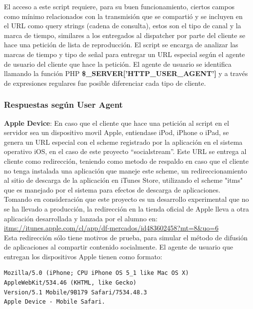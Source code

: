 El acceso a este script requiere, para su buen funcionamiento, ciertos campos como mínimo relacionados con la transmisión que se compartió y se incluyen en el URL como query strings (cadena de consulta), estos son el tipo de canal y la marca de tiempo, similares a los entregados al dispatcher por parte del cliente se hace una petición de lista de reproducción.
El script se encarga de analizar las marcas de tiempo y tipo de señal para entregar un URL especial según el agente de usuario del cliente que hace la petición.
El agente de usuario se identifica llamando la función PHP \textbf{\$\_SERVER['HTTP\_USER\_AGENT']} y a través de expresiones regulares fue posible diferenciar cada tipo de cliente.

		\subsubsection{Respuestas según User Agent}
\textbf{Apple Device}: En caso que el cliente que hace una petición al script en el servidor sea un dispositivo movil Apple, entiendase iPod, iPhone o iPad, se genera un URL especial con el scheme registrado por la aplicación en el sistema operativo iOS, en el caso de este proyecto \textquotedblleft socialstream\textquotedblright . Este URL se entrega al cliente como redirección, teniendo como metodo de respaldo en caso que el cliente no tenga instalada una aplicación que maneje este scheme, un redireccionamiento al sitio de descarga de la aplicación en iTunes Store, utilizando el scheme "itms" que es manejado por el sistema para efectos de descarga de aplicaciones. \\ 

Tomando en consideración que este proyecto es un desarrollo experimental que no se ha llevado a producción, la redirección en la tienda oficial de Apple lleva a otra aplicación desarrollada y lanzada por el alumno en: \url{itms://itunes.apple.com/cl/app/df-mercados/id483602458?mt=8\&uo=6} \\
Esta redirección sólo tiene motivos de prueba, para simular el método de difusión de aplicaciones al compartir contenido socialmente.
El agente de usuario que entregan los dispositivos Apple tienen como formato: 
	\begin {lstlisting}
Mozilla/5.0 (iPhone; CPU iPhone OS 5_1 like Mac OS X) 
AppleWebKit/534.46 (KHTML, like Gecko) 
Version/5.1 Mobile/9B179 Safari/7534.48.3
Apple Device - Mobile Safari.
\end{lstlisting} 
~\\ %

